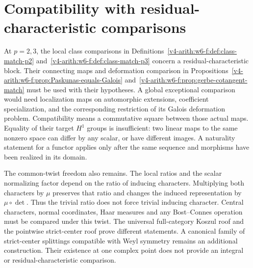\section{Compatibility with residual-characteristic comparisons}
\label{v4-arith:w10-d:obstruction-analysis}
\label{v4-arith:w10-d:prop:class-match-compat}
At $p=2,3$, the local class comparisons in
Definitions~\ref{v4-arith:w6-f:def:class-match-p2}
and~\ref{v4-arith:w6-f:def:class-match-p3} concern a residual-characteristic
block. Their connecting maps and deformation comparison in
Propositions~\ref{v4-arith:w6-f:prop:Paskunas-equals-Galois}
and~\ref{v4-arith:w6-f:prop:gerbe-cotangent-match} must be used with
their hypotheses. A global exceptional comparison would need
localization maps on automorphic extensions, coefficient specialization,
and the corresponding restriction of its Galois deformation problem.
Compatibility means a commutative square between those actual maps.
Equality of their target $H^1$ groups is insufficient: two linear maps
to the same nonzero space can differ by any scalar, or have different
images. A naturality statement for a functor applies only after the
same sequence and morphisms have been realized in its domain.

The common-twist freedom also remains. The local ratios and the scalar
normalizing factor depend on the ratio of inducing characters.
Multiplying both characters by $\mu$ preserves that ratio and changes
the induced representation by $\mu\circ\det$.
Thus the trivial ratio does not force trivial inducing character.
Central characters, normal coordinates, Haar measures and any
Bost--Connes operation must be compared under this twist.
The universal full-category Koszul roof and the pointwise strict-center
roof prove different statements. A canonical family of strict-center
splittings compatible with Weyl symmetry remains an additional
construction. Their existence at one complex point does not provide
an integral or residual-characteristic comparison.


